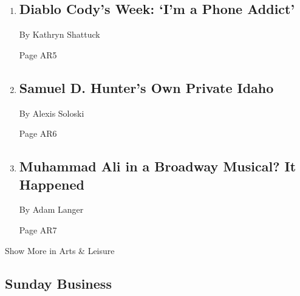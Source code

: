 \begin{enumerate}
\def\labelenumi{\arabic{enumi}.}
\item
  \href{/2019/11/28/arts/diablo-cody-diary.html}{}

  \hypertarget{diablo-codys-week-im-a-phone-addict}{%
  \subsection{Diablo Cody's Week: `I'm a Phone
  Addict'}\label{diablo-codys-week-im-a-phone-addict}}

  By Kathryn Shattuck

  Page AR5
\item
  \href{/2019/11/27/theater/samuel-d-hunter.html}{}

  \hypertarget{samuel-d-hunters-own-private-idaho}{%
  \subsection{Samuel D. Hunter's Own Private
  Idaho}\label{samuel-d-hunters-own-private-idaho}}

  By Alexis Soloski

  Page AR6
\item
  \href{/2019/11/28/theater/muhammad-ali-broadway-buck-white.html}{}

  \hypertarget{muhammad-ali-in-a-broadway-musical-it-happened}{%
  \subsection{Muhammad Ali in a Broadway Musical? It
  Happened}\label{muhammad-ali-in-a-broadway-musical-it-happened}}

  By Adam Langer

  Page AR7
\end{enumerate}

Show More in Arts \& Leisure

\hypertarget{sunday-business}{%
\subsection{Sunday Business}\label{sunday-business}}

